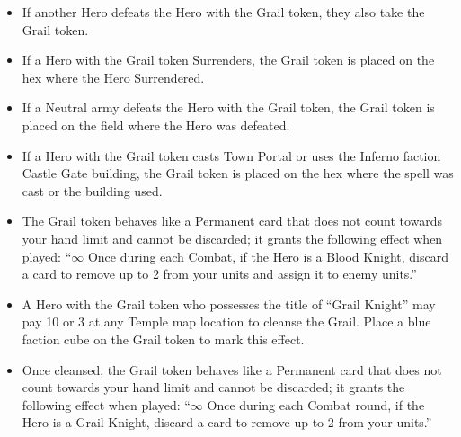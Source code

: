 \begin{multicols*}{2}
\begin{itemize}
  \item If another Hero defeats the Hero with the Grail token, they also take the Grail token.
  \item If a Hero with the Grail token Surrenders, the Grail token is placed on the hex where the Hero Surrendered.
  \item If a Neutral army defeats the Hero with the Grail token, the Grail token is placed on the field where the Hero was defeated.
  \item If a Hero with the Grail token casts Town Portal or uses the Inferno faction Castle Gate building, the Grail token is placed on the hex where the spell was cast or the building used.
  \item The Grail token behaves like a Permanent card that does not count towards your hand limit and cannot be discarded; it grants the following effect when played: ``$\infty$ Once during each Combat, if the Hero is a \textcolor{darkcandyapplered}{Blood Knight}, discard a card to remove up to 2  from your units and assign it to enemy units.''
  \item A Hero with the Grail token who possesses the title of ``\textcolor{cobalt}{Grail Knight}'' may pay 10  or 3  at any Temple map location to cleanse the Grail. Place a blue faction cube on the Grail token to mark this effect.
  \item Once cleansed, the Grail token behaves like a Permanent card that does not count towards your hand limit and cannot be discarded; it grants the following effect when played: ``$\infty$ Once during each Combat round, if the Hero is a \textcolor{cobalt}{Grail Knight}, discard a card to remove up to 2  from your units.''
\end{itemize}

\vspace*{\fill}

\begin{center}
\end{center}

\vspace*{\fill}

\end{multicols*}

